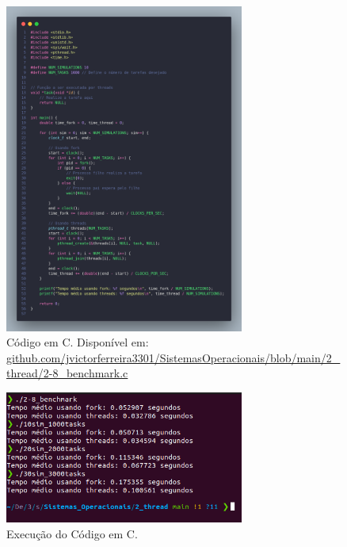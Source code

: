 \documentclass[
	12pt,				%
	openright,			%
	oneside,			%
	a4paper,			%
	chapter=TITLE,		%
	english,			%
	french,				%
	spanish,			%
	brazil				%
	]{abntex2}
\theoremstyle{definition}
\begin{document}
\begin{figure}
    \centering
    \includegraphics[width=0.7\textwidth]{imagens/processos_8.png}
    \caption{Código em C. Disponível em: \href{https://github.com/jvictorferreira3301/Sistemas_Operacionais/blob/main/2_thread/2-8_benchmark.c}{github.com/jvictorferreira3301/SistemasOperacionais/blob/main/2\_thread/2-8\_benchmark.c}}
    \label{fig:proc8}
\end{figure}

\begin{figure}
    \centering
    \includegraphics[width=0.7\textwidth]{imagens/run_processos_8.png}
    \caption{Execução do Código em C.}
    \label{fig:run8}
\end{figure}
\end{document}
